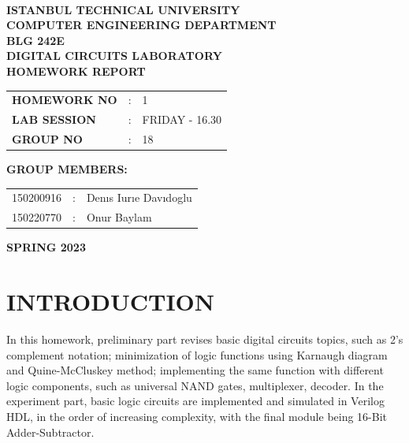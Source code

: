 \documentclass[pdftex,12pt,a4paper]{article}
\begin{document}
\begin{titlepage}
\begin{center}
\textbf{}\\
\textbf{\Large{ISTANBUL TECHNICAL UNIVERSITY}}\\
\vspace{0.5cm}
\textbf{\Large{COMPUTER ENGINEERING DEPARTMENT}}\\
\vspace{2cm}
\textbf{\Large{BLG 242E\\ DIGITAL CIRCUITS LABORATORY\\ HOMEWORK REPORT}}\\
\vspace{2.8cm}
\begin{table}[ht]
\centering
\Large{
\begin{tabular}{lcl}
\textbf{HOMEWORK NO}  & : & 1 \\
\textbf{LAB SESSION}  & : & FRIDAY - 16.30 \\
\textbf{GROUP NO}  & : & 18 \\
\end{tabular}}
\end{table}
\vspace{1cm}
\textbf{\Large{GROUP MEMBERS:}}\\
\begin{table}[ht]
\centering
\Large{
\begin{tabular}{rcl}
150200916  & : & Denıs Iurıe Davıdoglu \\
150220770  & : & Onur Baylam \\
\end{tabular}}
\end{table}
\vspace{2.8cm}
\textbf{\Large{SPRING 2023}}

\end{center}

\end{titlepage}

\thispagestyle{empty}
\setcounter{tocdepth}{4}
\tableofcontents
\clearpage

\setcounter{page}{1}

\section{INTRODUCTION}

In this homework, preliminary part revises basic digital circuits topics, such as 2's complement notation; minimization of logic functions using 
Karnaugh diagram and Quine-McCluskey method; implementing the same function with different logic components, such as universal NAND gates, multiplexer, decoder. In the experiment part, basic logic circuits are implemented and simulated in Verilog HDL, in the order of increasing complexity, with the final module being 16-Bit Adder-Subtractor.
\end{document}
